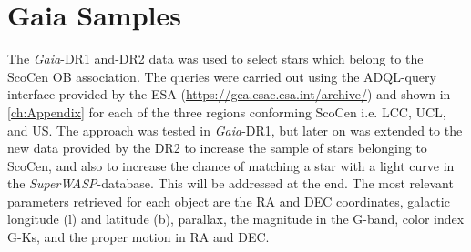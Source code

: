 
\section{Gaia Samples}\label{sec:GaiaSamples}

The \textit{Gaia}-DR1 and-DR2 data was used to select stars which belong to the ScoCen OB association. The queries were carried out using the ADQL-query interface provided by the ESA (\url{https://gea.esac.esa.int/archive/}) and shown in \autoref{ch:Appendix} for each of the three regions conforming ScoCen i.e. LCC, UCL, and US. The approach was tested in \textit{Gaia}-DR1, but later on was extended to the new data provided by the DR2 to increase the sample of stars belonging to ScoCen, and also to increase the chance of matching a star with a light curve in the \textit{SuperWASP}-database. This will be addressed at the end. The most relevant parameters retrieved for each object are the RA and DEC coordinates, galactic longitude (l) and latitude (b), parallax, the magnitude in the G-band, color index G-Ks, and the proper motion in RA and DEC.\\    

